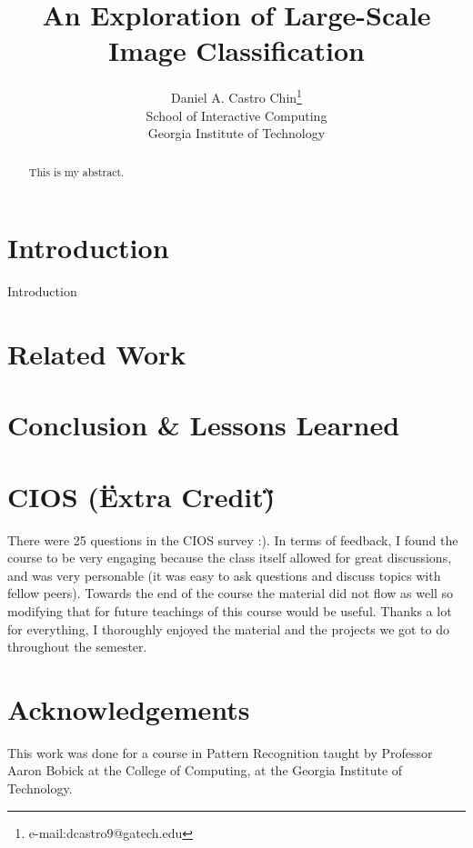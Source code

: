 \documentclass[conference]{acmsiggraph}
\title{An Exploration of Large-Scale Image Classification}
\author{Daniel A. Castro Chin\thanks{e-mail:dcastro9@gatech.edu}\\School of Interactive Computing\\Georgia Institute of Technology}
\begin{document}

\maketitle

\begin{abstract}

This is my abstract.

\end{abstract}

\TOGlinkslist
\copyrightspace

\section{Introduction}

Introduction

\section{Related Work}


\section{Conclusion & Lessons Learned}

\section{CIOS (\"Extra Credit\")}
There were 25 questions in the CIOS survey :). In terms of feedback, I found the course to be very engaging because the class itself allowed for great discussions, and was very personable (it was easy to ask questions and discuss topics with fellow peers). Towards the end of the course the material did not flow as well so modifying that for future teachings of this course would be useful. Thanks a lot for everything, I thoroughly enjoyed the material and the projects we got to do throughout the semester.
\section*{Acknowledgements}

This work was done for a course in Pattern Recognition taught by Professor Aaron Bobick at the College of Computing, at the Georgia Institute of Technology.



\end{document}
